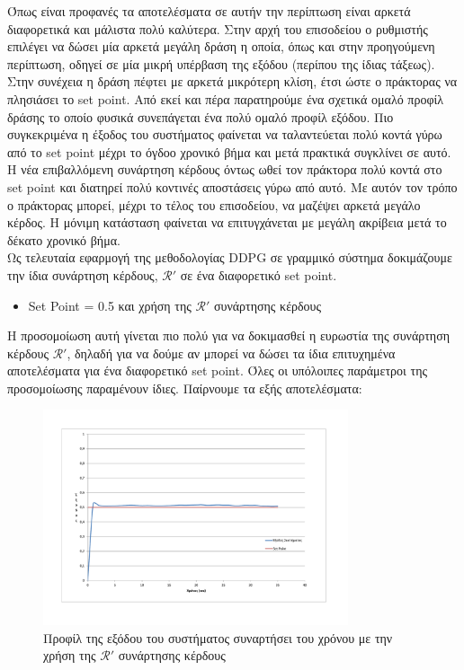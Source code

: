 \documentclass[11pt]{article} %
\numberwithin{equation}{subsection}
\begin{document}
Όπως είναι προφανές τα αποτελέσματα σε αυτήν την περίπτωση είναι αρκετά διαφορετικά και μάλιστα πολύ καλύτερα. Στην αρχή του επισοδείου ο ρυθμιστής επιλέγει να δώσει μία αρκετά μεγάλη δράση η οποία, όπως και στην προηγούμενη περίπτωση, οδηγεί σε μία μικρή υπέρβαση της εξόδου (περίπου της ίδιας τάξεως). Στην συνέχεια η δράση πέφτει με αρκετά μικρότερη κλίση, έτσι ώστε ο πράκτορας να πλησιάσει το set point. Από εκεί και πέρα παρατηρούμε ένα σχετικά ομαλό προφίλ δράσης το οποίο φυσικά συνεπάγεται ένα πολύ ομαλό προφίλ εξόδου. Πιο συγκεκριμένα η έξοδος του συστήματος φαίνεται να ταλαντεύεται πολύ κοντά γύρω από το set point μέχρι το όγδοο χρονικό βήμα και μετά πρακτικά συγκλίνει σε αυτό. Η νέα επιβαλλόμενη συνάρτηση κέρδους όντως ωθεί τον πράκτορα πολύ κοντά στο set point και διατηρεί πολύ κοντινές αποστάσεις γύρω από αυτό. Με αυτόν τον τρόπο ο πράκτορας μπορεί, μέχρι το τέλος του επισοδείου, να μαζέψει αρκετά μεγάλο κέρδος. Η μόνιμη κατάσταση φαίνεται να επιτυγχάνεται με μεγάλη ακρίβεια μετά το δέκατο χρονικό βήμα.\\

Ως τελευταία εφαρμογή της μεθοδολογίας DDPG σε γραμμικό σύστημα δοκιμάζουμε την ίδια συνάρτηση κέρδους, $\mathcal{R}'$ σε ένα διαφορετικό set point.\\

\begin{itemize}
\item Set Point = 0.5 και χρήση της $\mathcal{R}'$ συνάρτησης κέρδους
\end{itemize}
Η προσομοίωση αυτή γίνεται πιο πολύ για να δοκιμασθεί η ευρωστία της συνάρτηση κέρδους $\mathcal{R}'$, δηλαδή για να δούμε αν μπορεί να δώσει τα ίδια επιτυχημένα αποτελέσματα για ένα διαφορετικό set point. Όλες οι υπόλοιπες παράμετροι της προσομοίωσης παραμένουν ίδιες. Παίρνουμε τα εξής αποτελέσματα:

\begin{figure}[H]
    \centering
    \includegraphics[width=0.8\textwidth]{siso_output_3_reward_05.pdf}
    \caption{Προφίλ της εξόδου του συστήματος συναρτήσει του χρόνου με την χρήση της $\mathcal{R}'$ συνάρτησης κέρδους}
    \label{fig:siso_output_3_rewards_05}
\end{figure}
\end{document}
